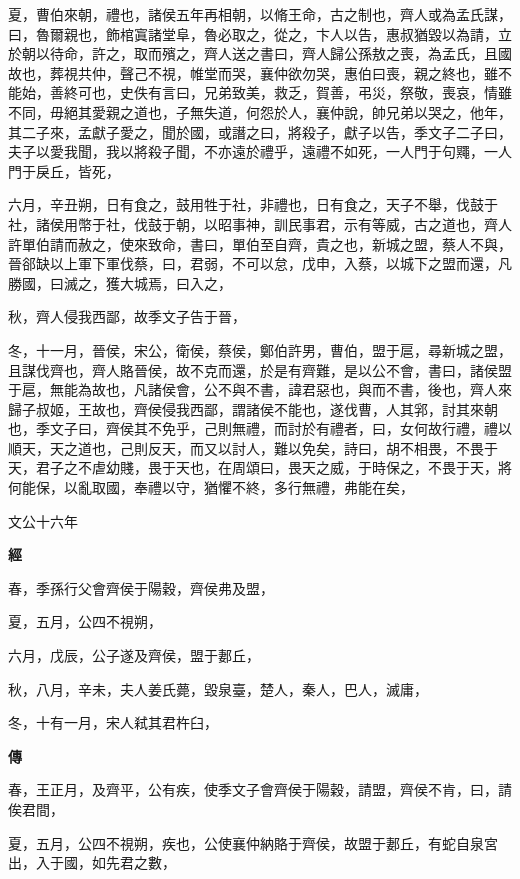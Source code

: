 \documentclass{ctexart}
\begin{document}
夏，曹伯來朝，禮也，諸侯五年再相朝，以脩王命，古之制也，齊人或為孟氏謀，曰，魯爾親也，飾棺寘諸堂阜，魯必取之，從之，卞人以告，惠叔猶毀以為請，立於朝以待命，許之，取而殯之，齊人送之書曰，齊人歸公孫敖之喪，為孟氏，且國故也，葬視共仲，聲己不視，帷堂而哭，襄仲欲勿哭，惠伯曰喪，親之終也，雖不能始，善終可也，史佚有言曰，兄弟致美，救乏，賀善，弔災，祭敬，喪哀，情雖不同，毋絕其愛親之道也，子無失道，何怨於人，襄仲說，帥兄弟以哭之，他年，其二子來，孟獻子愛之，聞於國，或譖之曰，將殺子，獻子以告，季文子二子曰，夫子以愛我聞，我以將殺子聞，不亦遠於禮乎，遠禮不如死，一人門于句鼆，一人門于戾丘，皆死，

六月，辛丑朔，日有食之，鼓用牲于社，非禮也，日有食之，天子不舉，伐鼓于社，諸侯用幣于社，伐鼓于朝，以昭事神，訓民事君，示有等威，古之道也，齊人許單伯請而赦之，使來致命，書曰，單伯至自齊，貴之也，新城之盟，蔡人不與，晉郤缺以上軍下軍伐蔡，曰，君弱，不可以怠，戊申，入蔡，以城下之盟而還，凡勝國，曰滅之，獲大城焉，曰入之，

秋，齊人侵我西鄙，故季文子告于晉，

冬，十一月，晉侯，宋公，衛侯，蔡侯，鄭伯許男，曹伯，盟于扈，尋新城之盟，且謀伐齊也，齊人賂晉侯，故不克而還，於是有齊難，是以公不會，書曰，諸侯盟于扈，無能為故也，凡諸侯會，公不與不書，諱君惡也，與而不書，後也，齊人來歸子叔姬，王故也，齊侯侵我西鄙，謂諸侯不能也，遂伐曹，人其郛，討其來朝也，季文子曰，齊侯其不免乎，己則無禮，而討於有禮者，曰，女何故行禮，禮以順天，天之道也，己則反天，而又以討人，難以免矣，詩曰，胡不相畏，不畏于天，君子之不虐幼賤，畏于天也，在周頌曰，畏天之威，于時保之，不畏于天，將何能保，以亂取國，奉禮以守，猶懼不終，多行無禮，弗能在矣，





文公十六年


\textbf{經}



春，季孫行父會齊侯于陽穀，齊侯弗及盟，

夏，五月，公四不視朔，

六月，戊辰，公子遂及齊侯，盟于郪丘，

秋，八月，辛未，夫人姜氏薨，毀泉臺，楚人，秦人，巴人，滅庸，

冬，十有一月，宋人弒其君杵臼，

\textbf{傳}



春，王正月，及齊平，公有疾，使季文子會齊侯于陽穀，請盟，齊侯不肯，曰，請俟君間，

夏，五月，公四不視朔，疾也，公使襄仲納賂于齊侯，故盟于郪丘，有蛇自泉宮出，入于國，如先君之數，
\end{document}
